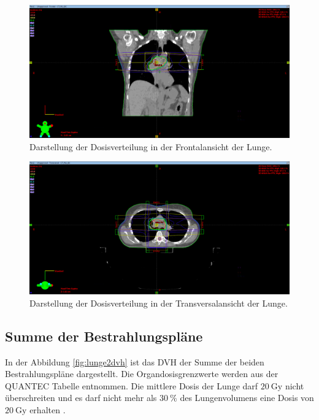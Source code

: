 \begin{figure}[H]
	\centering
	\includegraphics[width=\linewidth]{Bilder/Lunge2_Y}
	\caption{Darstellung der Dosisverteilung in der Frontalansicht der Lunge.}
	\label{fig:lunge2y}
\end{figure}

\begin{figure}[H]
	\centering
	\includegraphics[width=\linewidth]{Bilder/Lunge2_Z}
	\caption{Darstellung der Dosisverteilung in der Transversalansicht der Lunge.}
	\label{fig:lunge2z}
\end{figure}


\subsection*{Summe der Bestrahlungspläne}

In der Abbildung \ref{fig:lunge2dvh} ist das DVH der Summe der beiden Bestrahlungspläne dargestellt.
Die Organdosisgrenzwerte werden aus der QUANTEC Tabelle entnommen. Die mittlere Dosis der Lunge darf $\SI{20}{\gray}$ nicht überschreiten
und es darf nicht mehr als $\SI{30}{\percent}$ des Lungenvolumens eine Dosis von $\SI{20}{\gray}$ erhalten \cite{grenz}.

